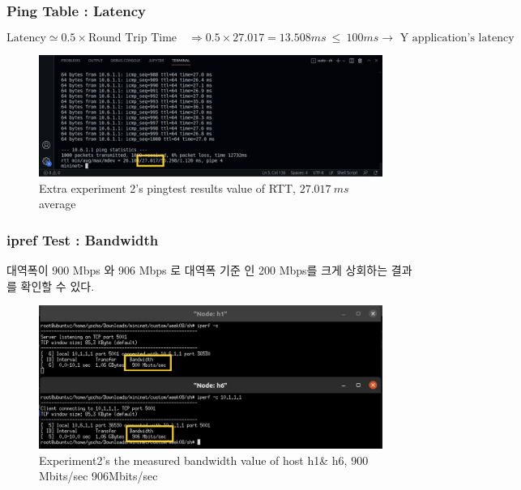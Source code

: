         \subsubsection*{Ping Table : Latency}
        \begin{equation*}
            \text{Latency} \simeq 0.5 \times \text{Round Trip Time} \quad \Rightarrow 0.5 \times 27.017 = 13.508 ms\ \leq\ 100 ms \to \text{ Y application's latency}
        \end{equation*}
            \vspace{-4mm}
        \begin{figure}[!h]\centering 
        	\includegraphics[width=.99\textwidth]{image/week08/e2-2.png}
        	\caption{\footnotesize
        	 Extra experiment 2's pingtest results value of RTT, $27.017\ ms$ average}
        	\vspace{-10pt}
        \end{figure}
        \subsubsection*{ipref Test : Bandwidth}
        대역폭이 900 Mbps 와 906 Mbps 로  대역폭 기준 인 200 Mbps를 크게 상회하는 결과를 확인할 수 있다. \\
\clearpage
        \begin{figure}[!h]\centering 
        	\includegraphics[width=.99\textwidth]{image/week08/e2-3.png}
        	\caption{\footnotesize
        	 Experiment2's the measured bandwidth value of host h1\& h6, 900 Mbits/sec 906Mbits/sec }
        	\vspace{-10pt}
        \end{figure}
\clearpage
